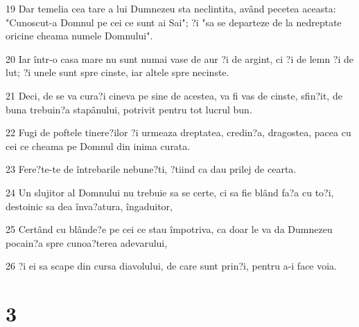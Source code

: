 \par 19 Dar temelia cea tare a lui Dumnezeu sta neclintita, având pecetea aceasta: "Cunoscut-a Domnul pe cei ce sunt ai Sai"; ?i "sa se departeze de la nedreptate oricine cheama numele Domnului".
\par 20 Iar într-o casa mare nu sunt numai vase de aur ?i de argint, ci ?i de lemn ?i de lut; ?i unele sunt spre cinste, iar altele spre necinste.
\par 21 Deci, de se va cura?i cineva pe sine de acestea, va fi vas de cinste, sfin?it, de buna trebuin?a stapânului, potrivit pentru tot lucrul bun.
\par 22 Fugi de poftele tinere?ilor ?i urmeaza dreptatea, credin?a, dragostea, pacea cu cei ce cheama pe Domnul din inima curata.
\par 23 Fere?te-te de întrebarile nebune?ti, ?tiind ca dau prilej de cearta.
\par 24 Un slujitor al Domnului nu trebuie sa se certe, ci sa fie blând fa?a cu to?i, destoinic sa dea înva?atura, îngaduitor,
\par 25 Certând cu blânde?e pe cei ce stau împotriva, ca doar le va da Dumnezeu pocain?a spre cunoa?terea adevarului,
\par 26 ?i ei sa scape din cursa diavolului, de care sunt prin?i, pentru a-i face voia.

\chapter{3}

